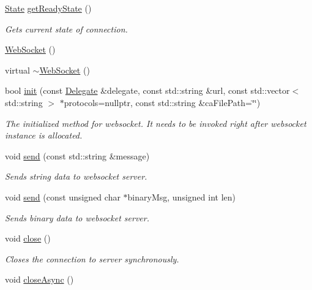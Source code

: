 \begin{DoxyCompactItemize}
\hyperlink{classnetwork_1_1WebSocket_a60680efaa16031262c8c50409356aa20}{State} \hyperlink{classnetwork_1_1WebSocket_aa4367a2657c9b3c82b3a8afc4f563524}{get\+Ready\+State} ()
\begin{DoxyCompactList}\small\item\em Gets current state of connection. \end{DoxyCompactList}\item 
\hyperlink{classnetwork_1_1WebSocket_a16ac6769f5e0225db15b644884a367ae}{Web\+Socket} ()
\item 
virtual \hyperlink{classnetwork_1_1WebSocket_a48afbe9b82fde4479913a1b931444729}{$\sim$\+Web\+Socket} ()
\item 
bool \hyperlink{classnetwork_1_1WebSocket_a7609cf6f64c0bf34218ca267298b9bad}{init} (const \hyperlink{classnetwork_1_1WebSocket_1_1Delegate}{Delegate} \&delegate, const std\+::string \&url, const std\+::vector$<$ std\+::string $>$ $\ast$protocols=nullptr, const std\+::string \&ca\+File\+Path=\char`\"{}\char`\"{})
\begin{DoxyCompactList}\small\item\em The initialized method for websocket. It needs to be invoked right after websocket instance is allocated. \end{DoxyCompactList}\item 
void \hyperlink{classnetwork_1_1WebSocket_a6a17081724ba19e6644521745adb6d04}{send} (const std\+::string \&message)
\begin{DoxyCompactList}\small\item\em Sends string data to websocket server. \end{DoxyCompactList}\item 
void \hyperlink{classnetwork_1_1WebSocket_aa13070e6df2d71b315207c016c6ec206}{send} (const unsigned char $\ast$binary\+Msg, unsigned int len)
\begin{DoxyCompactList}\small\item\em Sends binary data to websocket server. \end{DoxyCompactList}\item 
void \hyperlink{classnetwork_1_1WebSocket_abef10acf60b4d5b87399e6f9c5ad808d}{close} ()
\begin{DoxyCompactList}\small\item\em Closes the connection to server synchronously. \end{DoxyCompactList}\item 
void \hyperlink{classnetwork_1_1WebSocket_a3dd9f7d124fcb82f69c4a7114c1ed9bc}{close\+Async} ()

\end{DoxyCompactItemize}
